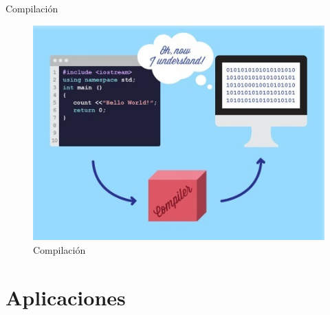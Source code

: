 \documentclass{beamer}
\begin{document}
\begin{frame}[t]{Compilación}\vspace{4pt}
\begin{figure}
	\centering
	\includegraphics[scale=0.45]{compiler}
	\caption{Compilación}
\end{figure}
\end{frame}

\section{Aplicaciones}
\end{document}
